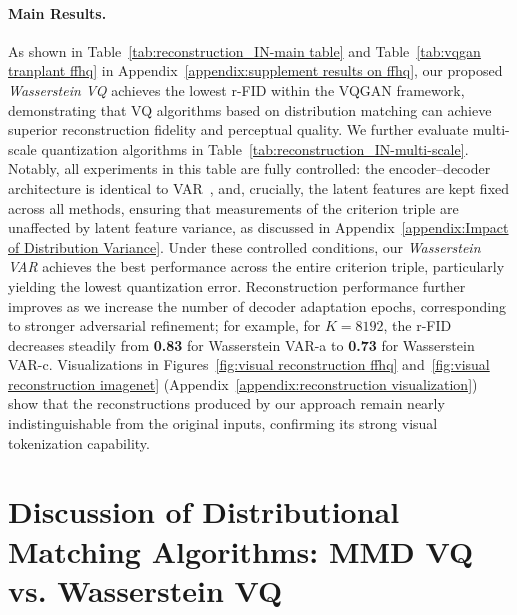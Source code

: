 \paragraph{Main Results.} As shown in Table~\ref{tab:reconstruction_IN-main table} and Table~\ref{tab:vqgan tranplant ffhq} in Appendix~\ref{appendix:supplement results on ffhq}, our proposed \emph{Wasserstein VQ} achieves the lowest r-FID within the VQGAN framework, demonstrating that VQ algorithms based on distribution matching can achieve superior reconstruction fidelity and perceptual quality. We further evaluate multi-scale quantization algorithms in Table~\ref{tab:reconstruction_IN-multi-scale}. Notably, all experiments in this table are fully controlled: the encoder–decoder architecture is identical to VAR~\citep{Tian2024VisualAM}, and, crucially, the latent features are kept fixed across all methods, ensuring that measurements of the criterion triple are unaffected by latent feature variance, as discussed in Appendix~\ref{appendix:Impact of Distribution Variance}. Under these controlled conditions, our \emph{Wasserstein VAR} achieves the best performance across the entire criterion triple, particularly yielding the lowest quantization error. Reconstruction performance further improves as we increase the number of decoder adaptation epochs, corresponding to stronger adversarial refinement; for example, for $K=8192$, the r-FID decreases steadily from \textbf{0.83} for Wasserstein VAR-a to \textbf{0.73} for Wasserstein VAR-c. Visualizations in Figures~\ref{fig:visual reconstruction ffhq} and~\ref{fig:visual reconstruction imagenet} (Appendix~\ref{appendix:reconstruction visualization}) show that the reconstructions produced by our approach remain nearly indistinguishable from the original inputs, confirming its strong visual tokenization capability.
\vspace{-1ex}



\section{Discussion of Distributional Matching Algorithms: MMD VQ vs. Wasserstein VQ}
\label{sec:discussion}